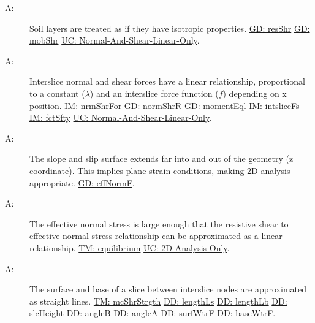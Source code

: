\documentclass[12pt]{article}
\newcounter{assumpnum}
\newcommand{\atheassumpnum}{A\theassumpnum}
\begin{document}
\begin{description}
\item[\atheassumpnum\label{A:Soil-Layers-Isotropic}:]Soil layers are treated as if they have isotropic properties. \hyperref[GD:resShr]{GD: resShr} \hyperref[GD:mobShr]{GD: mobShr} \hyperref[UC_normshearlinear]{UC: Normal-And-Shear-Linear-Only}.
\end{description}
\begin{description}
\item[\atheassumpnum\label{A:Interslice-Norm-Shear-Forces-Linear}:]Interslice normal and shear forces have a linear relationship, proportional to a constant ($λ$) and an interslice force function ($f$) depending on x position. \hyperref[IM:nrmShrFor]{IM: nrmShrFor} \hyperref[GD:normShrR]{GD: normShrR} \hyperref[GD:momentEql]{GD: momentEql} \hyperref[IM:intsliceFs]{IM: intsliceFs} \hyperref[IM:fctSfty]{IM: fctSfty} \hyperref[UC_normshearlinear]{UC: Normal-And-Shear-Linear-Only}.
\end{description}
\begin{description}
\item[\atheassumpnum\label{A:Plane-Strain-Conditions}:]The slope and slip surface extends far into and out of the geometry (z coordinate). This implies plane strain conditions, making 2D analysis appropriate. \hyperref[GD:effNormF]{GD: effNormF}.
\end{description}
\begin{description}
\item[\atheassumpnum\label{A:Effective-Norm-Stress-Large}:]The effective normal stress is large enough that the resistive shear to effective normal stress relationship can be approximated as a linear relationship. \hyperref[TM:equilibrium]{TM: equilibrium} \hyperref[UC_2donly]{UC: 2D-Analysis-Only}.
\end{description}
\begin{description}
\item[\atheassumpnum\label{A:Surface-Base-Slice-between-Interslice-Straight-Lines}:]The surface and base of a slice between interslice nodes are approximated as straight lines. \hyperref[TM:mcShrStrgth]{TM: mcShrStrgth} \hyperref[DD:lengthLs]{DD: lengthLs} \hyperref[DD:lengthLb]{DD: lengthLb} \hyperref[DD:slcHeight]{DD: slcHeight} \hyperref[DD:angleB]{DD: angleB} \hyperref[DD:angleA]{DD: angleA} \hyperref[DD:surfWtrF]{DD: surfWtrF} \hyperref[DD:baseWtrF]{DD: baseWtrF}.
\end{description}
\end{document}
